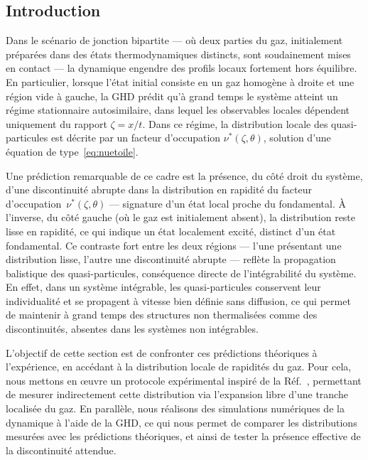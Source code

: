 \subsection*{Introduction}


Dans le scénario de jonction bipartite — où deux parties du gaz, initialement préparées dans des états thermodynamiques distincts, sont soudainement mises en contact — la dynamique engendre des profils locaux fortement hors équilibre. En particulier, lorsque l’état initial consiste en un gaz homogène à droite et une région vide à gauche, la GHD prédit qu’à grand temps le système atteint un régime stationnaire autosimilaire, dans lequel les observables locales dépendent uniquement du rapport $\zeta = x/t$. Dans ce régime, la distribution locale des quasi-particules est décrite par un facteur d’occupation $\nu^*(\zeta,\theta)$, solution d’une équation de type~\eqref{eq:nuetoile}.

\medskip

Une prédiction remarquable de ce cadre est la présence, du côté droit du système, d’une discontinuité abrupte dans la distribution en rapidité du facteur d’occupation~$\nu^*(\zeta,\theta)$ — signature d’un état local proche du fondamental. À l’inverse, du côté gauche (où le gaz est initialement absent), la distribution reste lisse en rapidité, ce qui indique un état localement excité, distinct d’un état fondamental. Ce contraste fort entre les deux régions — l’une présentant une distribution lisse, l’autre une discontinuité abrupte — reflète la propagation balistique des quasi-particules, conséquence directe de l’intégrabilité du système. En effet, dans un système intégrable, les quasi-particules conservent leur individualité et se propagent à vitesse bien définie sans diffusion, ce qui permet de maintenir à grand temps des structures non thermalisées comme des discontinuités, absentes dans les systèmes non intégrables.

\medskip

L’objectif de cette section est de confronter ces prédictions théoriques à l’expérience, en accédant à la distribution locale de rapidités du gaz. Pour cela, nous mettons en œuvre un protocole expérimental inspiré de la Réf.~\cite{dubois_probing_2024}, permettant de mesurer indirectement cette distribution via l’expansion libre d’une tranche localisée du gaz. En parallèle, nous réalisons des simulations numériques de la dynamique à l’aide de la GHD, ce qui nous permet de comparer les distributions mesurées avec les prédictions théoriques, et ainsi de tester la présence effective de la discontinuité attendue.

